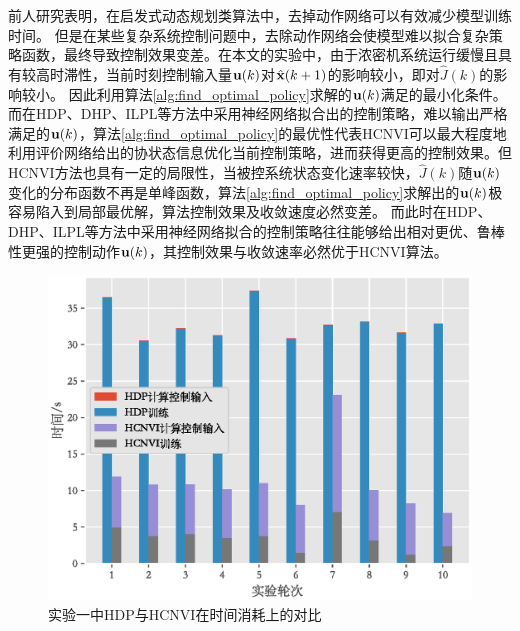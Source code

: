前人研究表明\cite{Luo2016}\cite{Padhi2006}，在启发式动态规划类算法中，去掉动作网络可以有效减少模型训练时间。
但是在某些复杂系统控制问题中，去除动作网络会使模型难以拟合复杂策略函数，最终导致控制效果变差。在本文的实验中，由于浓密机系统运行缓慢且具有较高时滞性，当前时刻控制输入量${\mathbf
u}(k)$对$\hat{\mathbf x}(k+1)$的影响较小，即对$\hat{J}(k)$的影响较小。
因此利用算法\ref{alg:find_optimal_policy}求解的${\mathbf
u}(k)$满足的最小化条件。
而在HDP、DHP、ILPL等方法中采用神经网络拟合出的控制策略，难以输出严格满足的${\mathbf
u}(k)$，算法\ref{alg:find_optimal_policy}的最优性代表HCNVI可以最大程度地利用评价网络给出的协状态信息优化当前控制策略，进而获得更高的控制效果。但HCNVI方法也具有一定的局限性，当被控系统状态变化速率较快，$\hat{J}(k)$随${\mathbf
u}(k)$变化的分布函数不再是单峰函数，算法\ref{alg:find_optimal_policy}求解出的${\mathbf
u}(k)$极容易陷入到局部最优解，算法控制效果及收敛速度必然变差。
而此时在HDP、DHP、ILPL等方法中采用神经网络拟合的控制策略往往能够给出相对更优、鲁棒性更强的控制动作${\mathbf
u}(k)$，其控制效果与收敛速率必然优于HCNVI算法。




\begin{figure}[hpbt]
    \centering
    \includegraphics[width=0.8\linewidth]{figures/chapter6/fig9.eps}
    \caption{实验一中HDP与HCNVI在时间消耗上的对比 }
    \label{fig:stable_time_cmp}
\end{figure}

